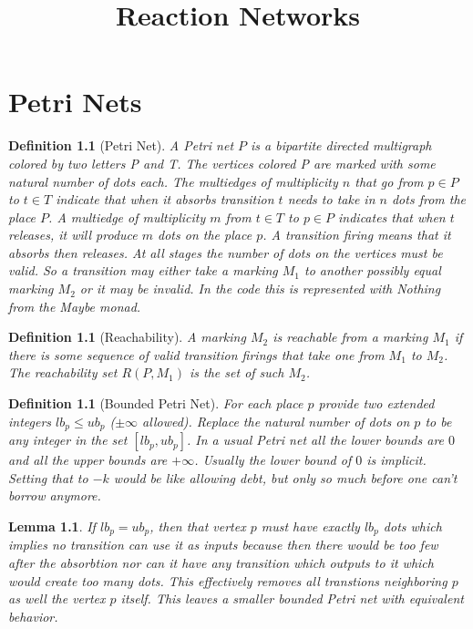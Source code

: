 \documentclass[11pt]{book}
\title{Reaction Networks}
\theoremstyle{change}
\newtheorem{definition}[equation]{Definition}
\newtheorem{lemma}[equation]{Lemma}
\theoremstyle{nonumberplain}
\numberwithin{equation}{section}
\begin{document}
\maketitle
\tableofcontents

\chapter{Petri Nets}

\begin{definition}[Petri Net]
A Petri net $P$ is a bipartite directed multigraph colored by two letters P and T. The vertices colored P are marked with some natural number of dots each. The multiedges of multiplicity $n$ that go from $p \in P$ to $t \in T$ indicate that when it absorbs transition $t$ needs to take in $n$ dots from the place $P$. A multiedge of multiplicity $m$ from $t \in T$ to $p \in P$ indicates that when $t$ releases, it will produce $m$ dots on the place $p$. A transition firing means that it absorbs then releases. At all stages the number of dots on the vertices must be valid. So a transition may either take a marking $M_1$ to another possibly equal marking $M_2$ or it may be invalid. In the code this is represented with Nothing from the Maybe monad.
\end{definition}

\begin{definition}[Reachability]
A marking $M_2$ is reachable from a marking $M_1$ if there is some sequence of valid transition firings that take one from $M_1$ to $M_2$. The reachability set $R(P,M_1)$ is the set of such $M_2$.
\end{definition}

\begin{definition}[Bounded Petri Net]
For each place $p$ provide two extended integers $lb_p \leq ub_p$ ($\pm \infty$ allowed). Replace the natural number of dots on $p$ to be any integer in the set $[lb_p,ub_p]$. In a usual Petri net all the lower bounds are $0$ and all the upper bounds are $+\infty$. Usually the lower bound of $0$ is implicit. Setting that to $-k$ would be like allowing debt, but only so much before one can't borrow anymore.
\end{definition}

\begin{lemma}
If $lb_p=ub_p$, then that vertex $p$ must have exactly $lb_p$ dots which implies no transition can use it as inputs because then there would be too few after the absorbtion nor can it have any transition which outputs to it which would create too many dots. This effectively removes all transtions neighboring $p$ as well the vertex $p$ itself. This leaves a smaller bounded Petri net with equivalent behavior.
\end{lemma}
\end{document}
